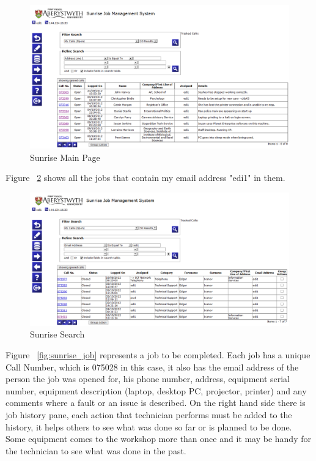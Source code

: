 \documentclass[10pt,a4paper,headinclude=true,twoside]{report}
\begin{document}
\begin{figure}[H]
\centering
\centerline{\includegraphics[scale=0.5]{./sunrise_main}}
\caption{Sunrise Main Page}
\label{fig:sunrise_main}
\end{figure}

Figure ~\ref{fig:sunrise_search} shows all the jobs that contain my email address "edi1" in them.

\begin{figure}[H]
\centering
\centerline{\includegraphics[scale=0.4]{./sunrise_search}}
\caption{Sunrise Search}
\label{fig:sunrise_search}
\end{figure}

Figure ~\ref{fig:sunrise_job} represents a job to be completed. Each job has a unique Call Number, which is 075028 in this case, it also has the email address of the person the job was opened for, his phone number, address, equipment serial number, equipment description (laptop, desktop PC, projector, printer) and any comments where a fault or an issue is described. On the right hand side there is job history pane, each action that technician performs must be added to the history, it helps others to see what was done so far or is planned to be done. Some equipment comes to the workshop more than once and it may be handy for the technician to see what was done in the past.
\end{document}
